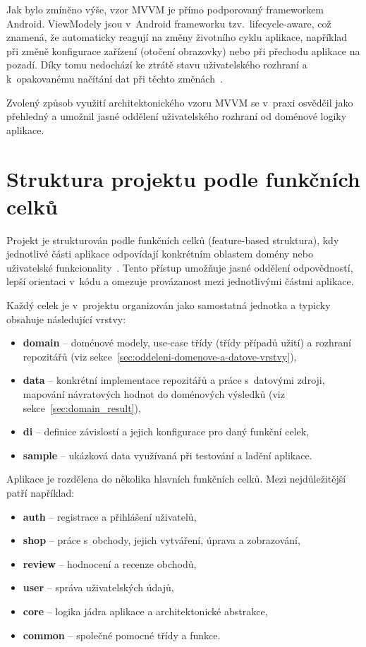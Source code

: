 Jak bylo zmíněno výše, vzor MVVM je přímo podporovaný frameworkem Android.
ViewModely jsou v~Android frameworku tzv.\ lifecycle-aware, což znamená, že automaticky reagují na změny životního cyklu aplikace, například při změně konfigurace zařízení (otočení obrazovky) nebo při přechodu aplikace na pozadí.
Díky tomu nedochází ke ztrátě stavu uživatelského rozhraní a k~opakovanému načítání dat při těchto změnách~\parencite{android_viewmodel_overview}.

Zvolený způsob využití architektonického vzoru MVVM se v~praxi osvědčil jako přehledný a umožnil jasné oddělení uživatelského rozhraní od doménové logiky aplikace.


\section{Struktura projektu podle funkčních celků}
Projekt je strukturován podle funkčních celků (feature-based struktura), kdy jednotlivé části aplikace odpovídají konkrétním oblastem domény nebo uživatelské funkcionality~\parencite{android_modularization_patterns, martin_clean_architecture}.
Tento přístup umožňuje jasné oddělení odpovědností, lepší orientaci v~kódu a omezuje provázanost mezi jednotlivými částmi aplikace.

Každý celek je v~projektu organizován jako samostatná jednotka a typicky obsahuje následující vrstvy:
\begin{itemize}
    \item \textbf{domain} -- doménové modely, use-case třídy (třídy případů užití) a rozhraní repozitářů (viz sekce~\ref{sec:oddeleni-domenove-a-datove-vrstvy}),
    \item \textbf{data} -- konkrétní implementace repozitářů a práce s~datovými zdroji, mapování návratových hodnot do doménových výsledků (viz sekce~\ref{sec:domain_result}),
    \item \textbf{di} -- definice závislostí a jejich konfigurace pro daný funkční celek,
    \item \textbf{sample} -- ukázková data využívaná při testování a ladění aplikace.
\end{itemize}

Aplikace je rozdělena do několika hlavních funkčních celků.
Mezi nejdůležitější patří například:
\begin{itemize}
    \item \textbf{auth} -- registrace a přihlášení uživatelů,
    \item \textbf{shop} -- práce s~obchody, jejich vytváření, úprava a zobrazování,
    \item \textbf{review} -- hodnocení a recenze obchodů,
    \item \textbf{user} -- správa uživatelských údajů,
    \item \textbf{core} -- logika jádra aplikace a architektonické abstrakce,
    \item \textbf{common} -- společné pomocné třídy a funkce.
\end{itemize}

